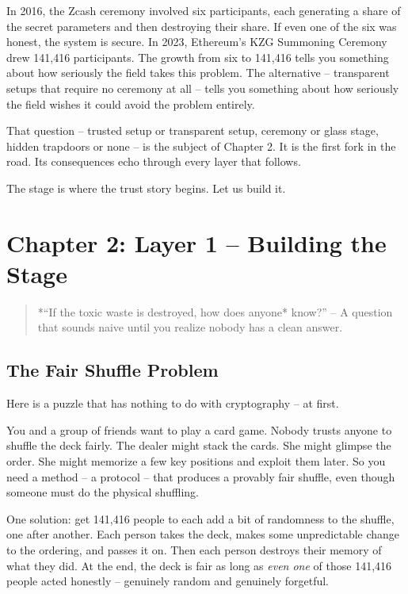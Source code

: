 \documentclass[
  11pt,
  openany]{report}
\begin{document}
In 2016, the Zcash ceremony involved six participants, each generating a share
of the secret parameters and then destroying their share. If even one of the six
was honest, the system is secure. In 2023, Ethereum's KZG Summoning Ceremony
drew 141,416 participants. The growth from six to 141,416 tells you something
about how seriously the field takes this problem. The alternative -- transparent
setups that require no ceremony at all -- tells you something about how
seriously the field wishes it could avoid the problem entirely.

That question -- trusted setup or transparent setup, ceremony or glass stage,
hidden trapdoors or none -- is the subject of Chapter 2. It is the first fork in
the road. Its consequences echo through every layer that follows.

The stage is where the trust story begins. Let us build it.

\chapter{Chapter 2: Layer 1 -- Building the
Stage}\label{chapter-2-layer-1-building-the-stage}

\begin{quote}
*``If the toxic waste is destroyed, how does anyone* know?'' -- A question that
sounds naive until you realize nobody has a clean answer.
\end{quote}

\section{The Fair Shuffle Problem}\label{the-fair-shuffle-problem}

Here is a puzzle that has nothing to do with cryptography -- at first.

You and a group of friends want to play a card game. Nobody trusts anyone to
shuffle the deck fairly. The dealer might stack the cards. She might glimpse the
order. She might memorize a few key positions and exploit them later. So you
need a method -- a protocol -- that produces a provably fair shuffle, even
though someone must do the physical shuffling.

One solution: get 141,416 people to each add a bit of randomness to the shuffle,
one after another. Each person takes the deck, makes some unpredictable change
to the ordering, and passes it on. Then each person destroys their memory of
what they did. At the end, the deck is fair as long as \emph{even one} of those
141,416 people acted honestly -- genuinely random and genuinely forgetful.
\end{document}
